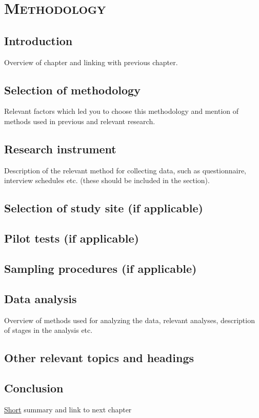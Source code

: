 %
%
% 
% 
% 

\chapter{\textsc{Methodology}}
\label{chap:method}

\section{Introduction}
\label{sec:introchapter3}
Overview of chapter and linking with previous chapter.

\section{Selection of methodology}
\label{sec:selectionmethod}

Relevant factors which led you to choose this methodology and mention of methods used in previous and relevant research.

\section{Research instrument}
\label{sec:researchinstrument}

Description of the relevant method for collecting data, such as questionnaire, interview schedules etc. (these should be included in the  section). 

\section{Selection of study site (if applicable)}

\section{Pilot tests (if applicable)}

\section{Sampling procedures (if applicable) }

\section{Data analysis}
\label{sec:dataanalysis}

Overview of methods used for analyzing the data, relevant analyses, description of stages in the analysis etc. 

\section{Other relevant topics and headings}
\label{sec:othertopics}

\section{Conclusion}
\label{sec:conclucionchapter3}
\underline{Short} summary and link to next chapter
